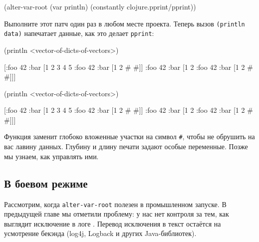 \begin{english}
  \begin{clojure}
(alter-var-root
 (var println)
 (constantly clojure.pprint/pprint))
  \end{clojure}
\end{english}

Выполните этот патч один раз в любом месте проекта. Теперь вызов
\verb|(println data)| напечатает данные, как это делает \verb|pprint|:

\ifnarrow

\begin{english}
  \begin{clojure}
(println <vector-of-dicts-of-vectors>)

[{:foo 42
  :bar [1 2 3 4 5 {:foo 42
                   :bar [1 2 {# #}]}]}
 {:foo 42
  :bar [1 2 {:foo 42
             :bar [1 2 {# #}]}]}]
  \end{clojure}
\end{english}

\else

\begin{english}
  \begin{clojure}
(println <vector-of-dicts-of-vectors>)

[{:foo 42
  :bar [1 2 3 4 5 {:foo 42
                   :bar [1 2 {# #}]}]}
 {:foo 42
  :bar [1 2 {:foo 42
             :bar [1 2 {# #}]}]}]
  \end{clojure}
\end{english}

\fi

Функция заменит глобоко вложенные участки на символ \verb|#|, чтобы не обрушить
на вас лавину данных. Глубину и длину печати задают особые переменные. Позже мы
узнаем, как управлять ими.

\subsection{В боевом режиме}

\label{install-logger}


Рассмотрим, когда \verb|alter-var-root| полезен в промышленном запуске. В
предыдущей главе мы отметили проблему: у нас нет контроля за тем, как выглядит
исключение в логе . Перевод исключения в текст остаётся на
усмотрение бекэнда (log4j, Logback и других Java-библиотек).

